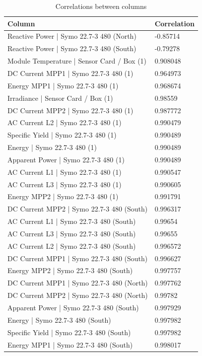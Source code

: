 \documentclass[a4paper,12pt]{article}
\begin{document}
\begin{table}[H]
\centering
\caption{Correlations between columns}
\begin{tabular}{ll}
\toprule
\textbf{Column} & \textbf{Correlation} \\
\midrule
Reactive Power | Symo 22.7-3 480 (North) & -0.85714 \\
Reactive Power | Symo 22.7-3 480 (South) & -0.79278 \\
Module Temperature | Sensor Card / Box (1) & 0.908048 \\
DC Current MPP1 | Symo 22.7-3 480 (1) & 0.964973 \\
Energy MPP1 | Symo 22.7-3 480 (1) & 0.968674 \\
Irradiance | Sensor Card / Box (1) & 0.98559 \\
DC Current MPP2 | Symo 22.7-3 480 (1) & 0.987772 \\
AC Current L2 | Symo 22.7-3 480 (1) & 0.990479 \\
Specific Yield | Symo 22.7-3 480 (1) & 0.990489 \\
Energy | Symo 22.7-3 480 (1) & 0.990489 \\
Apparent Power | Symo 22.7-3 480 (1) & 0.990489 \\
AC Current L1 | Symo 22.7-3 480 (1) & 0.990547 \\
AC Current L3 | Symo 22.7-3 480 (1) & 0.990605 \\
Energy MPP2 | Symo 22.7-3 480 (1) & 0.991791 \\
DC Current MPP2 | Symo 22.7-3 480 (South) & 0.996317 \\
AC Current L1 | Symo 22.7-3 480 (South) & 0.99654 \\
AC Current L3 | Symo 22.7-3 480 (South) & 0.99655 \\
AC Current L2 | Symo 22.7-3 480 (South) & 0.996572 \\
DC Current MPP1 | Symo 22.7-3 480 (South) & 0.996627 \\
Energy MPP2 | Symo 22.7-3 480 (South) & 0.997757 \\
DC Current MPP1 | Symo 22.7-3 480 (North) & 0.997762 \\
DC Current MPP2 | Symo 22.7-3 480 (North) & 0.99782 \\
Apparent Power | Symo 22.7-3 480 (South) & 0.997929 \\
Energy | Symo 22.7-3 480 (South) & 0.997982 \\
Specific Yield | Symo 22.7-3 480 (South) & 0.997982 \\
Energy MPP1 | Symo 22.7-3 480 (South) & 0.998017 \\

\end{tabular}
\end{table}
\end{document}
